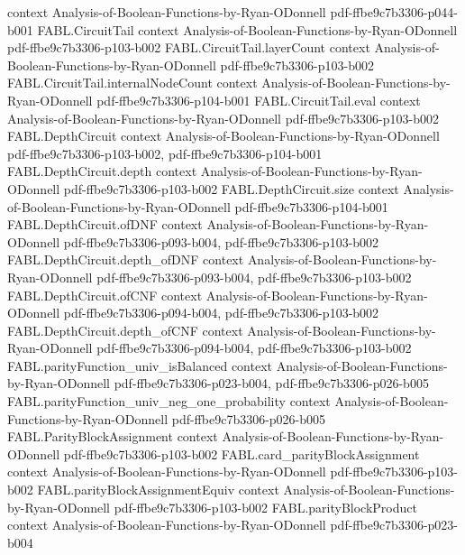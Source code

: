 \begin{theorem}
  {context}
  {Analysis-of-Boolean-Functions-by-Ryan-ODonnell}
  {pdf-ffbe9c7b3306-p044-b001}
\proofstep
  {FABL.CircuitTail}
  {context}
  {Analysis-of-Boolean-Functions-by-Ryan-ODonnell}
  {pdf-ffbe9c7b3306-p103-b002}
\proofstep
  {FABL.CircuitTail.layerCount}
  {context}
  {Analysis-of-Boolean-Functions-by-Ryan-ODonnell}
  {pdf-ffbe9c7b3306-p103-b002}
\proofstep
  {FABL.CircuitTail.internalNodeCount}
  {context}
  {Analysis-of-Boolean-Functions-by-Ryan-ODonnell}
  {pdf-ffbe9c7b3306-p104-b001}
\proofstep
  {FABL.CircuitTail.eval}
  {context}
  {Analysis-of-Boolean-Functions-by-Ryan-ODonnell}
  {pdf-ffbe9c7b3306-p103-b002}
\proofstep
  {FABL.DepthCircuit}
  {context}
  {Analysis-of-Boolean-Functions-by-Ryan-ODonnell}
  {pdf-ffbe9c7b3306-p103-b002,
    pdf-ffbe9c7b3306-p104-b001}
\proofstep
  {FABL.DepthCircuit.depth}
  {context}
  {Analysis-of-Boolean-Functions-by-Ryan-ODonnell}
  {pdf-ffbe9c7b3306-p103-b002}
\proofstep
  {FABL.DepthCircuit.size}
  {context}
  {Analysis-of-Boolean-Functions-by-Ryan-ODonnell}
  {pdf-ffbe9c7b3306-p104-b001}
\proofstep
  {FABL.DepthCircuit.ofDNF}
  {context}
  {Analysis-of-Boolean-Functions-by-Ryan-ODonnell}
  {pdf-ffbe9c7b3306-p093-b004,
    pdf-ffbe9c7b3306-p103-b002}
\proofstep
  {FABL.DepthCircuit.depth_ofDNF}
  {context}
  {Analysis-of-Boolean-Functions-by-Ryan-ODonnell}
  {pdf-ffbe9c7b3306-p093-b004,
    pdf-ffbe9c7b3306-p103-b002}
\proofstep
  {FABL.DepthCircuit.ofCNF}
  {context}
  {Analysis-of-Boolean-Functions-by-Ryan-ODonnell}
  {pdf-ffbe9c7b3306-p094-b004,
    pdf-ffbe9c7b3306-p103-b002}
\proofstep
  {FABL.DepthCircuit.depth_ofCNF}
  {context}
  {Analysis-of-Boolean-Functions-by-Ryan-ODonnell}
  {pdf-ffbe9c7b3306-p094-b004,
    pdf-ffbe9c7b3306-p103-b002}
\proofstep
  {FABL.parityFunction_univ_isBalanced}
  {context}
  {Analysis-of-Boolean-Functions-by-Ryan-ODonnell}
  {pdf-ffbe9c7b3306-p023-b004,
    pdf-ffbe9c7b3306-p026-b005}
\proofstep
  {FABL.parityFunction_univ_neg_one_probability}
  {context}
  {Analysis-of-Boolean-Functions-by-Ryan-ODonnell}
  {pdf-ffbe9c7b3306-p026-b005}
\proofstep
  {FABL.ParityBlockAssignment}
  {context}
  {Analysis-of-Boolean-Functions-by-Ryan-ODonnell}
  {pdf-ffbe9c7b3306-p103-b002}
\proofstep
  {FABL.card_parityBlockAssignment}
  {context}
  {Analysis-of-Boolean-Functions-by-Ryan-ODonnell}
  {pdf-ffbe9c7b3306-p103-b002}
\proofstep
  {FABL.parityBlockAssignmentEquiv}
  {context}
  {Analysis-of-Boolean-Functions-by-Ryan-ODonnell}
  {pdf-ffbe9c7b3306-p103-b002}
\proofstep
  {FABL.parityBlockProduct}
  {context}
  {Analysis-of-Boolean-Functions-by-Ryan-ODonnell}
  {pdf-ffbe9c7b3306-p023-b004}

\end{theorem}
